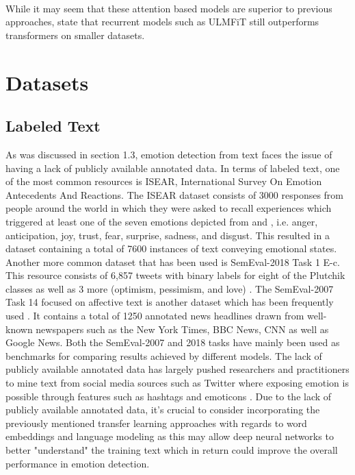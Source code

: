 \noindent
\\ While it may seem that these attention based models are superior to previous approaches, \citep{fastaiNLP} state that recurrent models such as ULMFiT still outperforms transformers on smaller datasets. 

\section{Datasets}

\subsection{Labeled Text}

As was discussed in section 1.3, emotion detection from text faces the issue of having a lack of publicly available annotated data. In terms of labeled text, one of the most common resources is ISEAR, International Survey On Emotion Antecedents And Reactions. The ISEAR dataset consists of 3000 responses from people around the world in which they were asked to recall experiences which triggered at least one of the seven emotions depicted from \citep{pdf:PaulEkmanEmotions} and \citep{plutchik1980general}, i.e. anger, anticipation, joy, trust, fear, surprise, sadness, and disgust. This resulted in a dataset containing a total of 7600 instances of text conveying emotional states. Another more common dataset that has been used is SemEval-2018 Task 1 E-c. This resource consists of 6,857 tweets with binary labels for eight of the Plutchik classes as well as 3 more (optimism, pessimism, and love) \citep{mohammad-etal-2018-semeval}. The SemEval-2007 Task 14 focused on affective text is another dataset which has been frequently used \citep{emodetect-review}. It contains a total of 1250 annotated news headlines drawn from well-known newspapers such as the New York Times, BBC News, CNN as well as Google News. Both the SemEval-2007 and 2018 tasks have mainly been used as benchmarks for comparing results achieved by different models. The lack of publicly available annotated data has largely pushed researchers and practitioners to mine text from social media sources such as Twitter where exposing emotion is possible through features such as hashtags and emoticons \citep{emodetect-review}. Due to the lack of publicly available annotated data, it's crucial to consider incorporating the previously mentioned transfer learning approaches with regards to word embeddings and language modeling as this may allow deep neural networks to better "understand" the training text which in return could improve the overall performance in emotion detection. 

